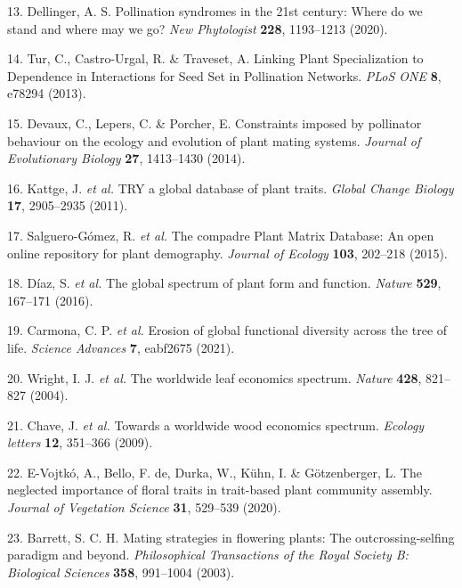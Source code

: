 \documentclass[12pt,a4paper,]{article}
\begin{document}
\hypertarget{ref-dellinger2020}{}
13. Dellinger, A. S. Pollination syndromes in the 21st century: Where do
we stand and where may we go? \emph{New Phytologist} \textbf{228},
1193--1213 (2020).

\hypertarget{ref-tur2013}{}
14. Tur, C., Castro-Urgal, R. \& Traveset, A. Linking Plant
Specialization to Dependence in Interactions for Seed Set in Pollination
Networks. \emph{PLoS ONE} \textbf{8}, e78294 (2013).

\hypertarget{ref-devaux2014}{}
15. Devaux, C., Lepers, C. \& Porcher, E. Constraints imposed by
pollinator behaviour on the ecology and evolution of plant mating
systems. \emph{Journal of Evolutionary Biology} \textbf{27}, 1413--1430
(2014).

\hypertarget{ref-kattge2011}{}
16. Kattge, J. \emph{et al.} TRY a global database of plant traits.
\emph{Global Change Biology} \textbf{17}, 2905--2935 (2011).

\hypertarget{ref-salguero2015}{}
17. Salguero-Gómez, R. \emph{et al.} The compadre Plant Matrix Database:
An open online repository for plant demography. \emph{Journal of
Ecology} \textbf{103}, 202--218 (2015).

\hypertarget{ref-diaz2016}{}
18. Díaz, S. \emph{et al.} The global spectrum of plant form and
function. \emph{Nature} \textbf{529}, 167--171 (2016).

\hypertarget{ref-carmona2021}{}
19. Carmona, C. P. \emph{et al.} Erosion of global functional diversity
across the tree of life. \emph{Science Advances} \textbf{7}, eabf2675
(2021).

\hypertarget{ref-wright2004}{}
20. Wright, I. J. \emph{et al.} The worldwide leaf economics spectrum.
\emph{Nature} \textbf{428}, 821--827 (2004).

\hypertarget{ref-chave2009}{}
21. Chave, J. \emph{et al.} Towards a worldwide wood economics spectrum.
\emph{Ecology letters} \textbf{12}, 351--366 (2009).

\hypertarget{ref-evojtko2020}{}
22. E-Vojtkó, A., Bello, F. de, Durka, W., Kühn, I. \& Götzenberger, L.
The neglected importance of floral traits in trait-based plant community
assembly. \emph{Journal of Vegetation Science} \textbf{31}, 529--539
(2020).

\hypertarget{ref-barrett2003}{}
23. Barrett, S. C. H. Mating strategies in flowering plants: The
outcrossing-selfing paradigm and beyond. \emph{Philosophical
Transactions of the Royal Society B: Biological Sciences} \textbf{358},
991--1004 (2003).
\end{document}
